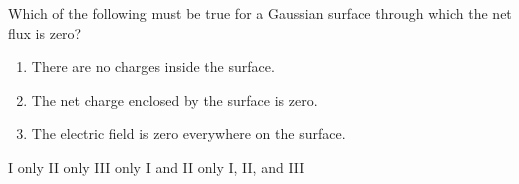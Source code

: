 
\begin{questions}
\setcounter{question}{4}

\question
Which of the following must be true for a Gaussian surface through which the net flux is zero?

\begin{enumerate}
    \item There are no charges inside the surface.
    \item The net charge enclosed by the surface is zero.
    \item The electric field is zero everywhere on the surface.
\end{enumerate}

\begin{oneparchoices}
    \choice I only
    \choice II only
    \choice III only
    \choice I and II only
    \choice I, II, and III
\end{oneparchoices}

\end{questions}
